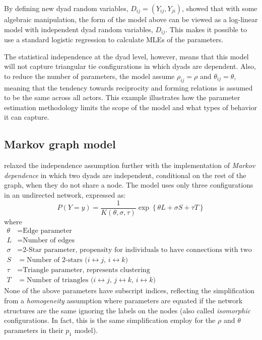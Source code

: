 By defining new dyad random variables, $D_{ij} = (Y_{ij}, Y_{ji} )$, \citeauthor
{Holland:1981}  showed that with some algebraic manipulation, the form of the model above 
can be viewed as a log-linear model with independent dyad random variables, 
$D_{ij}$.  This makes it possible to use a standard logistic regression to calculate MLEs of the parameters.

The statistical independence at the dyad level, however, means that this model will 
not capture triangular tie configurations in which dyads are dependent.  Also, to 
reduce the number of parameters, the model assume $\rho_{ij} = \rho$ and $\theta_{ij} = \theta$, meaning that the 
tendency towards reciprocity and forming relations is assumed to be the same across all actors.  This example 
illustrates how the parameter estimation methodology limits the scope of the model and 
what types of behavior it can capture.  

\subsection{Markov graph model}
\citet{Frank:1986} relaxed the independence assumption further with the implementation 
of \textit{Markov dependence} in which two dyads are independent, conditional on the 
rest of the graph, when they do not share a node.  The model uses only three 
configurations in an undirected network, expressed as:
\[
	P( Y = y ) = \frac{1}{K( \theta, \sigma, \tau)}\exp 
				\left \{ \theta L + \sigma S + \tau T	\right \} 
	\]
where
\begin{align*}
	\theta &= 		\text{Edge parameter} \\
	L &= 		\text{Number of edges} \\
	\sigma &= \text{2-Star parameter, propensity for individuals to have connections 
with two actors} \\
	S &= \text{Number of 2-stars ($i \leftrightarrow j$, $i \leftrightarrow k$) }\\
	\tau	&= \text{Triangle parameter, represents clustering} \\
	T &= \text{Number of triangles ($i \leftrightarrow j$, $j \leftrightarrow k$, $i 
\leftrightarrow k$)}
\end{align*}
None of the above parameters have subscript indices, reflecting the simplification 
from a \textit{homogeneity} assumption where parameters are equated if the 
network structures are the same ignoring the labels on the nodes (also called \textit
{isomorphic} configurations.  In fact, this is the same simplification \citeauthor{Holland:1981} employ for the $\rho$ and $\theta$ parameters in their $p_1$ model).


